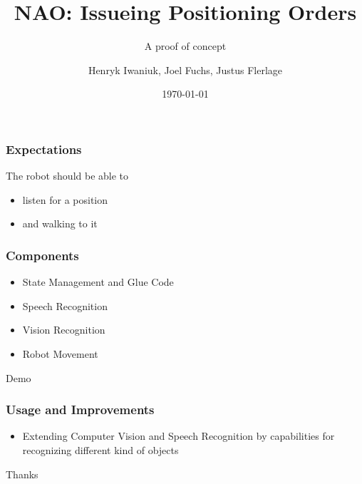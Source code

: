 \documentclass{beamer}
\title{NAO: Issueing Positioning Orders}
\subtitle{A proof of concept}
\author{Henryk Iwaniuk, Joel Fuchs, Justus Flerlage}
\date{\today}
\institute{https://github.com/Teszko/nao\_project}
\begin{document}
\maketitle

\begin{frame}
  \frametitle{Expectations}
  \pause
  The robot should be able to
  \pause
  \begin{itemize}
  \item listen for a position 
    \pause
  \item and walking to it
  \end{itemize}
\end{frame}

\begin{frame}
  \frametitle{Components}
  \pause
  \begin{itemize}
  \item State Management and Glue Code
    \pause
  \item Speech Recognition
    \pause
  \item Vision Recognition
    \pause
  \item Robot Movement
  \end{itemize}
\end{frame}

\begin{frame}[c]
  \begin{center}
    \Huge Demo
  \end{center}
\end{frame}

\begin{frame}
  \frametitle{Usage and Improvements}
  \begin{itemize}
    \item Extending Computer Vision and Speech Recognition by capabilities for
      recognizing different kind of objects
  \end{itemize}
\end{frame}

\begin{frame}[c]
  \begin{center}
    \Huge Thanks 
  \end{center}
\end{frame}
\end{document}
